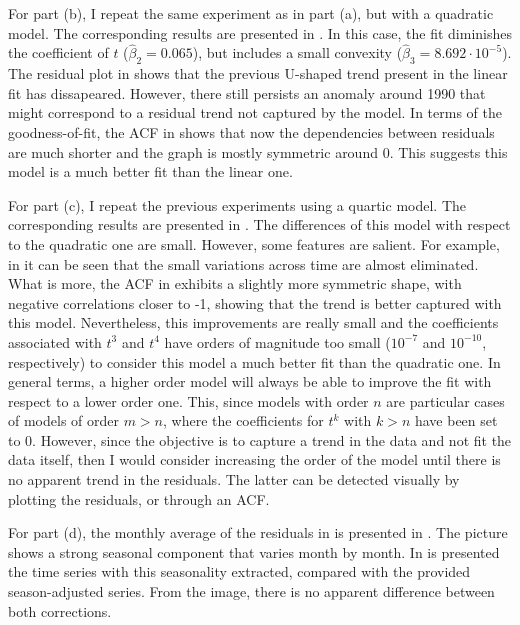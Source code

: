 \documentclass[11pt, english]{article}
\begin{document}
\begin{multicols}{2}
For part (b), I repeat the same experiment as in part (a), but with a quadratic model. The corresponding results are presented in . In this case, the fit diminishes the coefficient of $t$ ($\hat{\beta}_{2} = 0.065$), but includes a small convexity ($\hat{\beta}_{3} = 8.692 \cdot 10^{-5}$). The residual plot in  shows that the previous U-shaped trend present in the linear fit has dissapeared. However, there still persists an anomaly around 1990 that might correspond to a residual trend not captured by the model. In terms of the goodness-of-fit, the ACF in  shows that now the dependencies between residuals are much shorter and the graph is mostly symmetric around 0. This suggests this model is a much better fit than the linear one.

For part (c), I repeat the previous experiments using a quartic model. The corresponding results are presented in . The differences of this model with respect to the quadratic one are small. However, some features are salient. For example, in  it can be seen that the small variations across time are almost eliminated. What is more, the ACF in  exhibits a slightly more symmetric shape, with negative correlations closer to -1, showing that the trend is better captured with this model. Nevertheless, this improvements are really small and the coefficients associated with $t^{3}$ and $t^{4}$ have orders of magnitude too small ($10^{-7}$ and $10^{-10}$, respectively) to consider this model a much better fit than the quadratic one. In general terms, a higher order model will always be able to improve the fit with respect to a lower order one. This, since models with order $n$ are particular cases of models of order $m > n$, where the coefficients for $t^{k}$ with $k > n$ have been set to 0. However, since the objective is to capture a trend in the data and not fit the data itself, then I would consider increasing the order of the model until there is no apparent trend in the residuals. The latter can be detected visually by plotting the residuals, or through an ACF.

For part (d), the monthly average of the residuals in  is presented in . The picture shows a strong seasonal component that varies month by month. In  is presented the time series with this seasonality extracted, compared with the provided season-adjusted series. From the image, there is no apparent difference between both corrections. 


\end{multicols}
\end{document}
